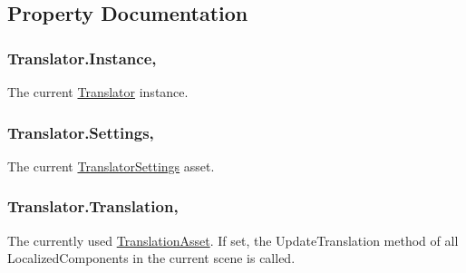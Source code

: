 \subsection{Property Documentation}
\subsubsection[{\texorpdfstring{Instance}{Instance}}]{ Translator.\+Instance\hspace{0.3cm}{\ttfamily [static]}, {\ttfamily [get]}}\hypertarget{class_translator_a72c84ed89a4595faa92d191f911a5bf4}{}\label{class_translator_a72c84ed89a4595faa92d191f911a5bf4}


The current \hyperlink{class_translator}{Translator} instance. 

\subsubsection[{\texorpdfstring{Settings}{Settings}}]{ Translator.\+Settings\hspace{0.3cm}{\ttfamily [static]}, {\ttfamily [get]}}\hypertarget{class_translator_a2d3689fa017bbfbe57d38dba4e359941}{}\label{class_translator_a2d3689fa017bbfbe57d38dba4e359941}


The current \hyperlink{class_translator_settings}{Translator\+Settings} asset. 

\subsubsection[{\texorpdfstring{Translation}{Translation}}]{ Translator.\+Translation\hspace{0.3cm}{\ttfamily [get]}, {\ttfamily [set]}}\hypertarget{class_translator_af3c31a41df2a540fa0bd94f92b69209e}{}\label{class_translator_af3c31a41df2a540fa0bd94f92b69209e}


The currently used \hyperlink{class_translation_asset}{Translation\+Asset}. If set, the Update\+Translation method of all Localized\+Components in the current scene is called. 

